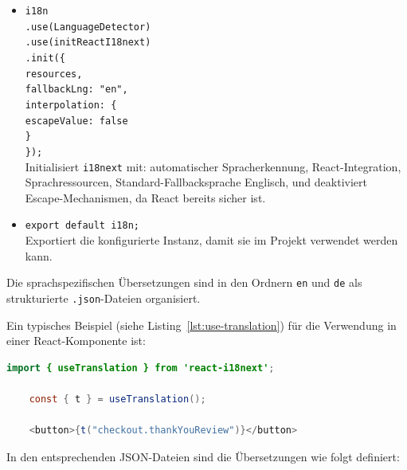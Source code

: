 \begin{itemize}
	\item \texttt{i18n} \\
	\hspace{1em} \texttt{.use(LanguageDetector)} \\
	\hspace{1em} \texttt{.use(initReactI18next)} \\
	\hspace{1em} \texttt{.init(\{} \\
	\hspace{2em} \texttt{resources,} \\
	\hspace{2em} \texttt{fallbackLng: "en",} \\
	\hspace{2em} \texttt{interpolation: \{} \\
	\hspace{3em} \texttt{escapeValue: false} \\
	\hspace{2em} \texttt{\}} \\
	\hspace{1em} \texttt{\});} \\
	Initialisiert \texttt{i18next} mit: automatischer Spracherkennung, React-Integration, Sprachressourcen, Standard-Fallbacksprache Englisch, und deaktiviert Escape-Mechanismen, da React bereits sicher ist.
	
	\item \texttt{export default i18n;} \\
	Exportiert die konfigurierte Instanz, damit sie im Projekt verwendet werden kann.
\end{itemize}

\noindent Die sprachspezifischen Übersetzungen sind in den Ordnern \texttt{en} und \texttt{de} als strukturierte \texttt{.json}-Dateien organisiert.

\noindent Ein typisches Beispiel (siehe Listing~\ref{lst:use-translation}) für die Verwendung in einer React-Komponente ist:

\begin{lstlisting}[language=Java, caption={Beispielhafte Nutzung von \texttt{useTranslation}}, label={lst:use-translation}]
	import { useTranslation } from 'react-i18next';
	
	const { t } = useTranslation();
	
	<button>{t("checkout.thankYouReview")}</button>
\end{lstlisting}

\noindent In den entsprechenden JSON-Dateien sind die Übersetzungen wie folgt definiert:

